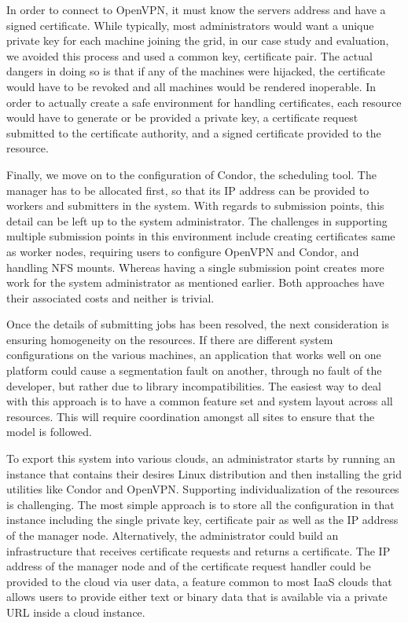 \documentclass[conference]{IEEEtran}
\begin{document}
In order to connect to OpenVPN, it must know the servers address and have a
signed certificate.  While typically, most administrators would want a unique
private key for each machine joining the grid, in our case study and
evaluation, we avoided this process and used a common key, certificate pair.
The actual dangers in doing so is that if any of the machines were hijacked,
the certificate would have to be revoked and all machines would be rendered
inoperable.  In order to actually create a safe environment for handling
certificates, each resource would have to generate or be provided a private
key, a certificate request submitted to the certificate authority, and a signed
certificate provided to the resource.

Finally, we move on to the configuration of Condor, the scheduling tool.  The
manager has to be allocated first, so that its IP address can be provided to
workers and submitters in the system.  With regards to submission points, this
detail can be left up to the system administrator.  The challenges in
supporting multiple submission points in this environment include creating
certificates same as worker nodes,  requiring users to configure OpenVPN and
Condor, and handling NFS mounts.  Whereas having a single submission point
creates more work for the system administrator as mentioned earlier.  Both
approaches have their associated costs and neither is trivial.

Once the details of submitting jobs has been resolved, the next consideration
is ensuring homogeneity on the resources.  If there are different system
configurations on the various machines, an application that works well on one
platform could cause a segmentation fault on another, through no fault of the
developer, but rather due to library incompatibilities.  The easiest way to
deal with this approach is to have a common feature set and system layout
across all resources.  This will require coordination amongst all sites to
ensure that the model is followed.

To export this system into various clouds, an administrator starts by running
an instance that contains their desires Linux distribution and then installing
the grid utilities like Condor and OpenVPN.  Supporting individualization of
the resources is challenging.  The most simple approach is to store all the
configuration in that instance including the single private key, certificate
pair as well as the IP address of the manager node.  Alternatively, the
administrator could build an infrastructure that receives certificate requests
and returns a certificate.  The IP address of the manager node and of the
certificate request handler could be provided to the cloud via user data, a
feature common to most IaaS clouds that allows users to provide either text or
binary data that is available via a private URL inside a cloud instance.
\end{document}
